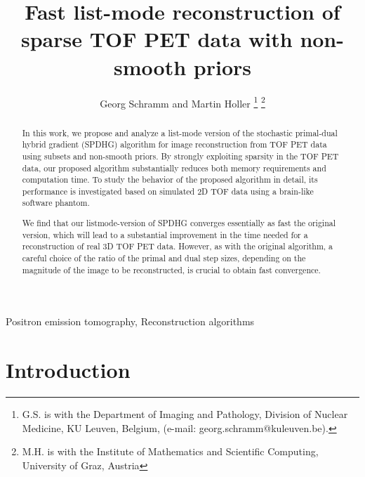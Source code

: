 \documentclass{IEEEtran}
\begin{document}
\title{\vspace{-0.6cm}Fast list-mode reconstruction of sparse TOF PET data with non-smooth priors} 
\author{Georg Schramm and Martin Holler\vspace{-1cm}
\thanks{G.S. is with the Department of Imaging and Pathology, Division of Nuclear Medicine,
KU Leuven, Belgium, (e-mail: georg.schramm@kuleuven.be).}
\thanks{M.H. is with the Institute of Mathematics and Scientific Computing, 
University of Graz, Austria}
}

\maketitle

\begin{abstract}
In this work, we propose and analyze a list-mode version of the stochastic primal-dual hybrid gradient
(SPDHG) algorithm for image reconstruction from TOF PET data using subsets and non-smooth priors. 
By strongly exploiting sparsity in the TOF PET data, our proposed algorithm substantially reduces both memory requirements and computation time. 
To study the behavior of the proposed algorithm in detail, its performance 
is investigated based on simulated 2D TOF data using a brain-like software phantom.

We find that our listmode-version of SPDHG converges essentially as fast the original version,
which will lead to a substantial improvement in the time needed for a reconstruction
of real 3D TOF PET data.
However, as with the original algorithm, a careful choice of the ratio of the primal and dual step sizes, 
depending on the magnitude of the image to be reconstructed, is crucial to obtain fast convergence.
\end{abstract}

\begin{IEEEkeywords}
Positron emission tomography, Reconstruction algorithms
\end{IEEEkeywords}

\section{Introduction}
\end{document}
